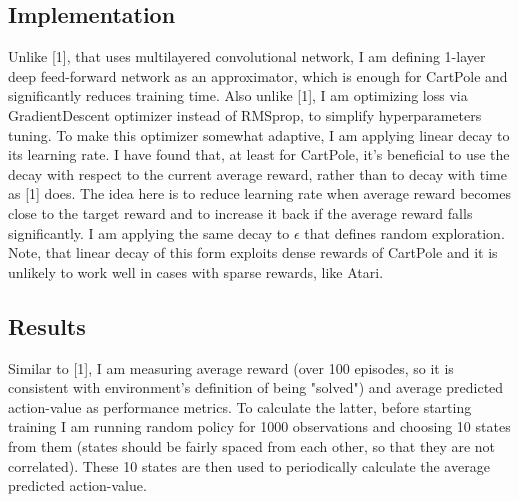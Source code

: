 \documentclass{article}
\begin{document}
\subsection{Implementation}
Unlike [1], that uses multilayered convolutional network, I am defining 1-layer deep feed-forward network as an approximator, which is enough for CartPole and significantly reduces training time. Also unlike [1], I am optimizing loss via GradientDescent optimizer instead of RMSprop, to simplify hyperparameters tuning. To make this optimizer somewhat adaptive, I am applying linear decay to its learning rate. I have found that, at least for CartPole, it's beneficial to use the decay with respect to the current average reward, rather than to decay with time as [1] does. The idea here is to reduce learning rate when average reward becomes close to the target reward and to increase it back if the average reward falls significantly. I am applying the same decay to $\epsilon$ that defines random exploration. Note, that linear decay of this form exploits dense rewards of CartPole and it is unlikely to work well in cases with sparse rewards, like Atari.

\subsection{Results}
Similar to [1], I am measuring average reward (over 100 episodes, so it is consistent with environment's definition of being "solved") and average predicted action-value as performance metrics. To calculate the latter, before starting training I am running random policy for 1000 observations and choosing 10 states from them (states should be fairly spaced from each other, so that they are not correlated). These 10 states are then used to periodically calculate the average predicted action-value.
\end{document}

